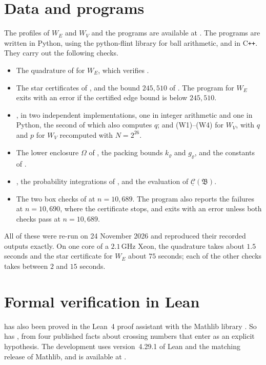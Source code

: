 \documentclass[11pt,colorlinks]{charlie}
\begin{document}
\section{Data and programs}\label{app:replay}
The profiles of $W_E$ and $W_V$ and the programs are available at \coderepo. The programs are written in Python, using the python-flint library for ball arithmetic, and in C\texttt{++}. They carry out the following checks.
\begin{itemize}
\item The quadrature of  for $W_E$, which verifies .
\item The star certificates of , and the bound $245{,}510$ of . The program for $W_E$ exits with an error if the certified edge bound is below $245{,}510$.
\item {}, in two independent implementations, one in integer arithmetic and one in Python, the second of which also computes $q$; and (W1)--(W4) for $W_V$, with $q$ and $p$ for $W_V$ recomputed with $N=2^{26}$.
\item The lower enclosure $\Omega$ of , the packing bounds $k_\varrho$ and $g_\varrho$, and the constants of .
\item {}, the probability integrations of , and the evaluation of $\underline{\mathcal C}(\mathfrak B)$.
\item The two box checks of  at $n=10{,}689$. The program also reports the failures at $n=10{,}690$, where the certificate stops, and exits with an error unless both checks pass at $n=10{,}689$.
\end{itemize}
All of these were re-run on 24 November 2026 and reproduced their recorded outputs exactly. On one core of a $2.1$\,GHz Xeon, the quadrature takes about $1.5$ seconds and the star certificate for $W_E$ about $75$ seconds; each of the other checks takes between $2$ and $15$ seconds.

\section{Formal verification in Lean}\label{app:lean}
 has also been proved in the Lean~4 proof assistant \cite{Lean4} with the Mathlib library \cite{Mathlib}. So has , from four published facts about crossing numbers that enter as an explicit hypothesis. The development uses version~4.29.1 of Lean and the matching release of Mathlib, and is available at \coderepo.
\end{document}
